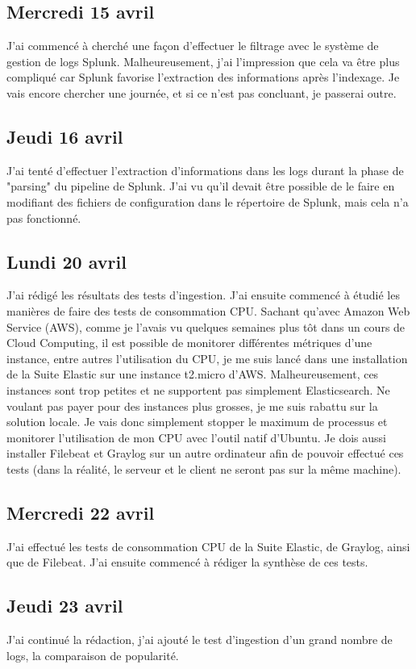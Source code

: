 \documentclass[paper=a4, fontsize=11pt]{scrartcl}
\begin{document}
\subsection{Mercredi 15 avril}
    J'ai commencé à cherché une façon d'effectuer le filtrage avec le système de gestion de logs Splunk. Malheureusement, j'ai l'impression que cela va être plus compliqué car Splunk favorise l'extraction des informations après l'indexage. Je vais encore chercher une journée, et si ce n'est pas concluant, je passerai outre.
\subsection{Jeudi 16 avril}
    J'ai tenté d'effectuer l'extraction d'informations dans les logs durant la phase de "parsing" du pipeline de Splunk. J'ai vu qu'il devait être possible de le faire en modifiant des fichiers de configuration dans le répertoire de Splunk, mais cela n'a pas fonctionné.
\subsection{Lundi 20 avril}
    J'ai rédigé les résultats des tests d'ingestion. J'ai ensuite commencé à étudié les manières de faire des tests de consommation CPU. Sachant qu'avec Amazon Web Service (AWS), comme je l'avais vu quelques semaines plus tôt dans un cours de Cloud Computing, il est possible de monitorer différentes métriques d'une instance, entre autres l'utilisation du CPU, je me suis lancé dans une installation de la Suite Elastic sur une instance t2.micro d'AWS. Malheureusement, ces instances sont trop petites et ne supportent pas simplement Elasticsearch. Ne voulant pas payer pour des instances plus grosses, je me suis rabattu sur la solution locale. Je vais donc simplement stopper le maximum de processus et monitorer l'utilisation de mon CPU avec l'outil natif d'Ubuntu. Je dois aussi installer Filebeat et Graylog sur un autre ordinateur afin de pouvoir effectué ces tests (dans la réalité, le serveur et le client ne seront pas sur la même machine).
\subsection{Mercredi 22 avril}
    J'ai effectué les tests de consommation CPU de la Suite Elastic, de Graylog, ainsi que de Filebeat. J'ai ensuite commencé à rédiger la synthèse de ces tests.
\subsection{Jeudi 23 avril}
    J'ai continué la rédaction, j'ai ajouté le test d'ingestion d'un grand nombre de logs, la comparaison de popularité.
\end{document}
